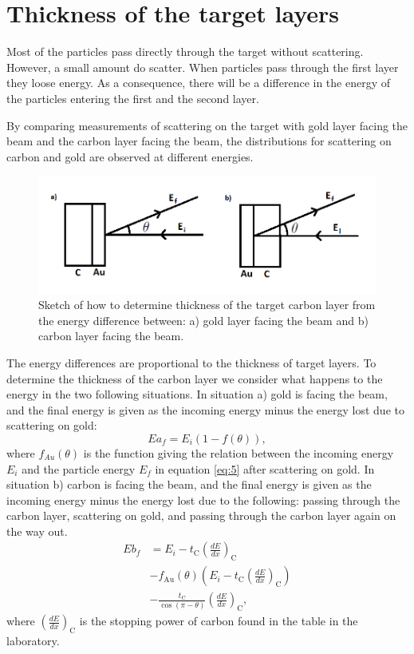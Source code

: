 \section{Thickness of the target layers} 
Most of the particles pass directly through the target without scattering. However, a small amount do scatter. When particles pass through the first layer they loose energy. As a consequence, there will be a difference in the energy of the particles entering the first and the second layer. 

By comparing measurements of scattering on the target with gold layer facing the beam and the carbon layer facing the beam, the distributions for scattering on carbon and gold are observed at different energies. 

\begin{figure}[h]
\centering
\includegraphics[width=0.99\columnwidth]{tykkelse.png}
\caption{Sketch of how to determine thickness of the target carbon layer from the energy difference between: a) gold layer facing the beam and b) carbon layer facing the beam.}
\label{fig_sketch_thickness}
\end{figure}


The energy differences are proportional to the thickness of target layers. To determine the thickness of the carbon layer we consider what happens to the energy in the two following situations. In situation a) gold is facing the beam, and the final energy is given as the incoming energy minus the energy lost due to scattering on gold:
\begin{equation*}
Ea_f = E_i (1-f(\theta)), 
\end{equation*}
where $f_{Au}(\theta)$ is the function giving the relation between the incoming energy $E_i$ and the particle energy $E_f$ in equation \cref{eq:5} after scattering on gold. 
In situation b) carbon is facing the beam, and the final energy is given as the incoming energy minus the energy lost due to the following: passing through the carbon layer, scattering on gold, and passing through the carbon layer again on the way out. 
\begin{align*}
Eb_f &= E_i - t_\mathrm{C} \left(\frac{dE}{dx}\right)_\mathrm{C} 
\\ &- f_\mathrm{Au}(\theta) \left(E_i - t_\mathrm{C} \left(\frac{dE}{dx}\right)_\mathrm{C} \right) \\ &- \frac{t_\mathrm{C}}{\cos(\pi-\theta)} \left(\frac{dE}{dx}\right)_\mathrm{C}, 
\end{align*}
where $\left(\frac{dE}{dx}\right)_\mathrm{C}$ is the stopping power of carbon found in the table in the laboratory.

